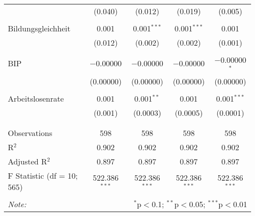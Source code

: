 \begin{table}[!htbp]
\begin{tabular}{@{\extracolsep{5pt}}lcccc}
  & (0.040) & (0.012) & (0.019) & (0.005) \\ 
  & & & & \\ 
 Bildungsgleichheit & 0.001 & 0.001$^{***}$ & 0.001$^{***}$ & 0.001 \\ 
  & (0.012) & (0.002) & (0.002) & (0.001) \\ 
  & & & & \\ 
 BIP & $-$0.00000 & $-$0.00000 & $-$0.00000 & $-$0.00000$^{*}$ \\ 
  & (0.00000) & (0.00000) & (0.00000) & (0.00000) \\ 
  & & & & \\ 
 Arbeitslosenrate & 0.001 & 0.001$^{**}$ & 0.001 & 0.001$^{***}$ \\ 
  & (0.001) & (0.0003) & (0.0005) & (0.0001) \\ 
  & & & & \\ 
\hline \\[-1.8ex] 
Observations & 598 & 598 & 598 & 598 \\ 
R$^{2}$ & 0.902 & 0.902 & 0.902 & 0.902 \\ 
Adjusted R$^{2}$ & 0.897 & 0.897 & 0.897 & 0.897 \\ 
F Statistic (df = 10; 565) & 522.386$^{***}$ & 522.386$^{***}$ & 522.386$^{***}$ & 522.386$^{***}$ \\ 
\hline 
\hline \\[-1.8ex] 
\textit{Note:}  & \multicolumn{4}{r}{$^{*}$p$<$0.1; $^{**}$p$<$0.05; $^{***}$p$<$0.01} \\ 
\end{tabular} 
\end{table} 
